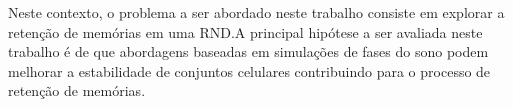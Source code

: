 Neste contexto, o problema a ser abordado neste trabalho consiste em explorar a retenção de memórias em uma RND.\@ A principal
hipótese a ser avaliada neste trabalho é de que abordagens baseadas em simulações de fases do sono podem melhorar a estabilidade
de conjuntos celulares contribuindo para o processo de retenção de memórias.






